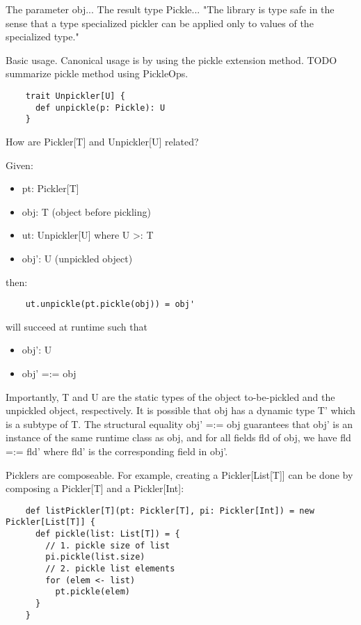\documentclass[preprint,10pt]{sigplanconf}
\theoremstyle{definition}
\begin{document}
The parameter obj... The result type Pickle...
"The library is type safe in the sense that a type specialized pickler can be applied only to values of the specialized type."

Basic usage. Canonical usage is by using the pickle extension method. TODO summarize pickle method using PickleOps.

\begin{verbatim}
    trait Unpickler[U] {
      def unpickle(p: Pickle): U
    }
\end{verbatim}
How are Pickler[T] and Unpickler[U] related?

Given:
\begin{itemize}
  \item pt: Pickler[T]
  \item obj: T (object before pickling)
  \item ut: Unpickler[U] where U >: T
  \item obj': U (unpickled object)
\end{itemize}

then:

\begin{verbatim}
    ut.unpickle(pt.pickle(obj)) = obj'
\end{verbatim}

will succeed at runtime such that

\begin{itemize}
  \item obj': U
  \item obj' =:= obj
\end{itemize}

Importantly, T and U are the static types of the object to-be-pickled and the unpickled object, respectively. It is possible that obj has a dynamic type T' which is a subtype of T. The structural equality obj' =:= obj guarantees that obj' is an instance of the same runtime class as obj, and for all fields fld of obj, we have fld =:= fld' where fld' is the corresponding field in obj'.

Picklers are composeable. For example, creating a Pickler[List[T]] can be done by composing a Pickler[T] and a Pickler[Int]:

\begin{verbatim}
    def listPickler[T](pt: Pickler[T], pi: Pickler[Int]) = new Pickler[List[T]] {
      def pickle(list: List[T]) = {
        // 1. pickle size of list
        pi.pickle(list.size)
        // 2. pickle list elements
        for (elem <- list)
          pt.pickle(elem)
      }
    }
\end{verbatim}
\end{document}
